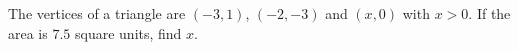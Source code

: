 The vertices of a triangle are $(-3,1)$, $(-2,-3)$ and $(x,0)$ with $x>0$. If the area is $7.5$ square units, find $x$.
